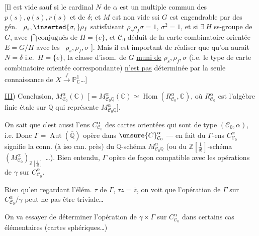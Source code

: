 [Il est vide sauf si le cardinal $N$ de $\alpha$ est un multiple commun des $p(s),q(s),r(s)$ et de $\delta$; \deleted{$\unsure{\exists}$} et $M$ est non vide ssi \deleted{$\exists$} $G$  est engendrable par des gén.\  $\rho_s,\inserted{\sigma,}\rho_f$ satisfaisant $\rho_s\rho_f\sigma=1$, $\sigma^2=1$, et si \deleted{$\unsure{\forall}$} $\exists\ H$ ss-groupe de $G$, avec $\bigcap\text{conjugués de }H=\{e\}$, et $\mathcal C_0$ déduit de la carte combinatoire orientée $E=G/H$ avec les \ $\rho_s,\rho_f,\sigma$ ]. Mais il est important de réaliser que  qu'on aurait $N=\delta$ i.e.\ $H=\{e\}$, la classe d'isom. de $G$ \uline{muni de} $\rho_s,\rho_f,\sigma$ (i.e. le type de carte combinatoire orientée correspondante) \uline{n'est pas} déterminée par la seule connaissance de $X\xrightarrow{f}\mathbb P^1_{\mathbb C}$\ldots]

\uline{III}) Conclusion,  $M^{\alpha}_{\mathcal C_0}(\mathbb C)$ [$=M^{\alpha}_{\mathcal C_0\mathbb Q}(\mathbb C)\simeq\operatorname{Hom}(R^{\alpha}_{\mathcal C_0},\mathbb C)$, où $R^{\alpha}_{\mathcal C_0}$ est l'algèbre finie étale sur $\mathbb Q$ qui représente $M^{\alpha}_{\mathcal C_0\mathbb Q}$].

On sait que c'est aussi l'ens $C^{\alpha}_{\mathcal C_0}$ des  cartes  orientées qui sont de type $(\mathcal C_0,\alpha)$, i.e. Donc $\Gamma=\operatorname{Aut}(\overline{\mathbb Q})$ opère dans $\unsure{C}^{\alpha}_{\mathcal C_0}$ --- en fait   du $\Gamma$-ens  $C^{\alpha}_{\mathcal C_0}$ signifie  la conn. (à iso can. près) du $\mathbb Q$-schéma $M^{\alpha}_{\mathcal C_0\mathbb Q}$ (ou du $\mathbb Z[\frac1{\delta!}]$-schéma $(M^{\alpha}_{\mathcal C_0})_{\mathbb Z[\frac1{\delta!}]}$ \ldots). Bien entendu, $\Gamma$ opère de façon compatible  avec les opérations de $\gamma$ sur $C^{\alpha}_{\mathcal C_0}$.

Rien qu'en regardant l'élém. $\tau$ de $\Gamma$, $\tau z=\bar z$, on voit que l'opération de $\Gamma$ sur $C^{\alpha}_{\mathcal C_0}/\gamma$ peut ne pas être triviale\ldots

On va essayer de déterminer l'opération de $\gamma\times\Gamma$ sur $C^{\alpha}_{\mathcal C_0}$ dans certains cas élémentaires (cartes sphériques\ldots)


